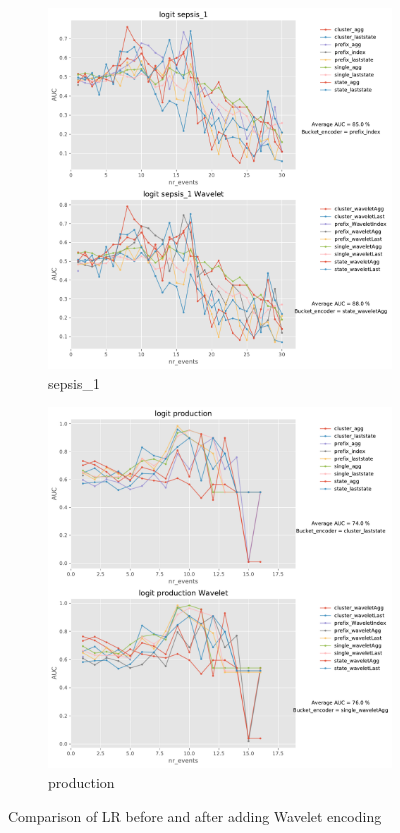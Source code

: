 \documentclass[twoside,11pt]{Latex/Classes/PhDthesisPSnPDF}
\begin{document}
\begin{figure}[!htbp]
	\medskip
	\begin{subfigure}{0.48\textwidth}
		\includegraphics[width=\linewidth]{images/wavelet/graphs2logit/sepsis_1.pdf}	
		\caption{sepsis\_1} 
	\end{subfigure}\hspace*{\fill}
	\begin{subfigure}{0.48\textwidth}
		\includegraphics[width=\linewidth]{images/wavelet/graphs2logit/production.pdf}
		\caption{production}
	\end{subfigure}
	\caption{Comparison of LR before and after adding Wavelet encoding}
	\label{fig:wl1}
\end{figure}
\end{document}

